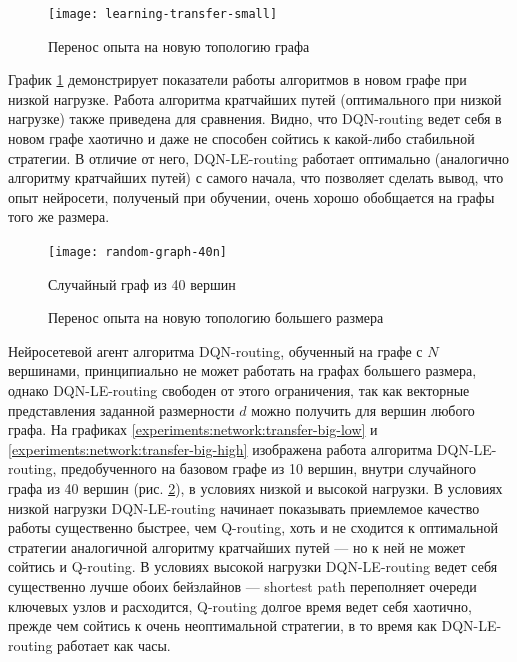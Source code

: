 \documentclass[specification,annotation,times]{itmo-student-thesis}
\theoremstyle{definition}
\begin{document}
\begin{figure}[!h]
  \caption{Перенос опыта на новую топологию графа}\label{experiments:network:transfer-small}
  \centering
  \texttt{[image: learning-transfer-small]}
\end{figure}

График \ref{experiments:network:transfer-small} демонстрирует показатели работы
алгоритмов в новом графе при низкой нагрузке. Работа алгоритма кратчайших
путей (оптимального при низкой нагрузке) также приведена для сравнения. Видно,
что DQN-routing ведет себя в новом графе хаотично и даже не способен сойтись к
какой-либо стабильной стратегии. В отличие от него, DQN-LE-routing работает
оптимально (аналогично алгоритму кратчайших путей) с самого начала, что
позволяет сделать вывод, что опыт нейросети, полученый при обучении, очень
хорошо обобщается на графы того же размера.

\begin{figure}[!h]
  \caption{Случайный граф из 40 вершин}\label{fig-random-net-40n}
  \centering
  \texttt{[image: random-graph-40n]}
\end{figure}

\begin{figure}[!h]
  \centering
  \hfil
  \caption{Перенос опыта на новую топологию большего размера}\label{experiments:network:transfer-big}
\end{figure}

Нейросетевой агент алгоритма DQN-routing, обученный на графе с $N$ вершинами,
принципиально не может работать на графах большего размера, однако
DQN-LE-routing свободен от этого ограничения, так как векторные представления
заданной размерности $d$ можно получить для вершин любого графа. На графиках
\ref{experiments:network:transfer-big-low} и
\ref{experiments:network:transfer-big-high} изображена работа алгоритма
DQN-LE-routing, предобученного на базовом графе из 10 вершин, внутри случайного
графа из 40 вершин (рис. \ref{fig-random-net-40n}), в условиях низкой и высокой
нагрузки. В условиях низкой нагрузки DQN-LE-routing начинает показывать
приемлемое качество работы существенно быстрее, чем Q-routing, хоть и не
сходится к оптимальной стратегии аналогичной алгоритму кратчайших путей --- но к
ней не может сойтись и Q-routing. В условиях высокой нагрузки DQN-LE-routing
ведет себя существенно лучше обоих бейзлайнов --- shortest path переполняет
очереди ключевых узлов и расходится, Q-routing долгое время ведет себя хаотично,
прежде чем сойтись к очень неоптимальной стратегии, в то время как
DQN-LE-routing работает как часы.
\end{document}
